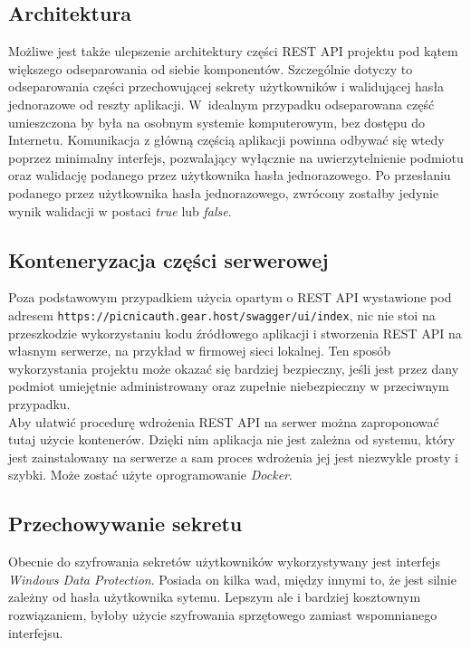 \subsection{Architektura}
Możliwe jest także ulepszenie architektury części REST API projektu pod kątem większego odseparowania od siebie komponentów.
Szczególnie dotyczy to odseparowania części przechowującej sekrety użytkowników i walidującej hasła jednorazowe od reszty
aplikacji. 
W~idealnym przypadku odseparowana część umieszczona by była na osobnym systemie komputerowym, bez dostępu do Internetu. 
Komunikacja z główną częścią aplikacji powinna odbywać się wtedy poprzez minimalny interfejs, pozwalający wyłącznie na 
uwierzytelnienie podmiotu oraz walidację podanego przez użytkownika hasła jednorazowego. 
Po przesłaniu podanego przez użytkownika hasła jednorazowego, 
zwrócony zostałby jedynie wynik walidacji w postaci \textit{true} lub \textit{false}.

\subsection{Konteneryzacja części serwerowej}
Poza podstawowym przypadkiem użycia opartym o REST API wystawione pod adresem \texttt{https://picnicauth.gear.host/swagger/ui/index},
nic nie stoi na przeszkodzie wykorzystaniu kodu źródłowego aplikacji i stworzenia REST API na własnym serwerze, na przykład w firmowej
sieci lokalnej. Ten sposób wykorzystania projektu może okazać się bardziej bezpieczny, jeśli jest przez dany podmiot 
umiejętnie administrowany oraz zupełnie niebezpieczny w przeciwnym przypadku. \\
Aby ułatwić procedurę wdrożenia REST API na serwer można zaproponować tutaj użycie kontenerów. 
Dzięki nim aplikacja nie jest zależna od systemu, który jest zainstalowany na serwerze a sam proces wdrożenia jej
jest niezwykle prosty i szybki.
Może zostać użyte oprogramowanie \textit{Docker}. 

\subsection{Przechowywanie sekretu}
Obecnie do szyfrowania sekretów użytkowników wykorzystywany jest interfejs \textit{Windows Data Protection}. 
Posiada on kilka wad, między innymi to, że jest silnie zależny od hasła użytkownika sytemu. 
Lepszym ale i bardziej kosztownym rozwiązaniem, byłoby użycie szyfrowania sprzętowego zamiast wspomnianego interfejsu.
